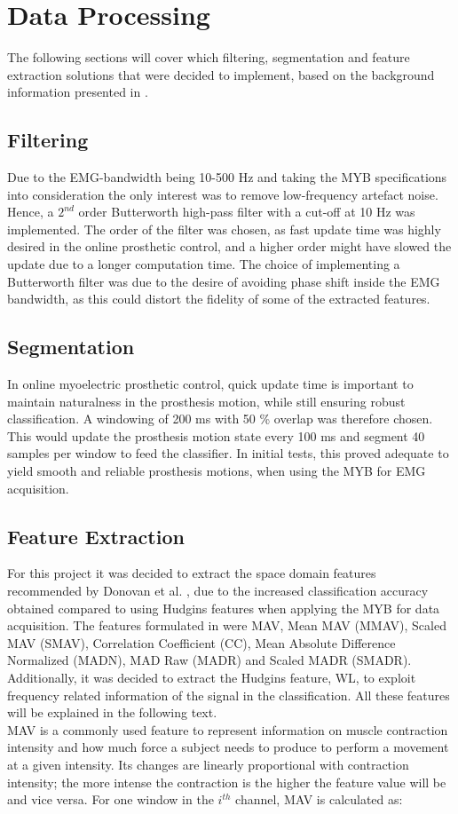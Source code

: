 \section{Data Processing}
The following sections will cover which filtering, segmentation and feature extraction solutions that were decided to implement, based on the background information presented in . 

\subsection{Filtering}
Due to the EMG-bandwidth being 10-500 Hz and taking the MYB specifications into consideration the only interest was to remove low-frequency artefact noise. Hence, a $2^{nd}$ order Butterworth high-pass filter with a cut-off at 10 Hz was implemented. The order of the filter was chosen, as fast update time was highly desired in the online prosthetic control, and a higher order might have slowed the update due to a longer computation time. The choice of implementing a Butterworth filter was due to the desire of avoiding phase shift inside the EMG bandwidth, as this could distort the fidelity of some of the extracted features. 

\subsection{Segmentation}
In online myoelectric prosthetic control, quick update time is important to maintain naturalness in the prosthesis motion, while still ensuring robust classification. A windowing of 200 ms with 50 \% overlap was therefore chosen. This would update the prosthesis motion state every 100 ms and segment 40 samples per window to feed the classifier. In initial tests, this proved adequate to yield smooth and reliable prosthesis motions, when using the MYB for EMG acquisition. 

\subsection{Feature Extraction}
For this project it was decided to extract the space domain features recommended by Donovan et al. \cite{Donovan2017}, due to the increased classification accuracy obtained compared to using Hudgins features when applying the MYB for data acquisition. The features formulated in \cite{Donovan2017} were MAV, Mean MAV (MMAV), Scaled MAV (SMAV), Correlation Coefficient (CC), Mean Absolute Difference Normalized (MADN), MAD Raw (MADR) and Scaled MADR (SMADR). Additionally, it was decided to extract the Hudgins feature, WL, to exploit frequency related information of the signal in the classification. All these features will be explained in the following text. \\
MAV is a commonly used feature to represent information on muscle contraction intensity and how much force a subject needs to produce to perform a movement at a given intensity. Its changes are linearly proportional with contraction intensity; the more intense the contraction is the higher the feature value will be and vice versa. For one window in the $i^{th}$ channel, MAV is calculated as:

